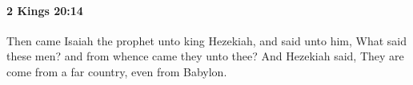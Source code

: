 
		\paragraph{2 Kings 20:14} %
			\label{2KINGS-20-14}

			Then came Isaiah the prophet unto king Hezekiah, and said unto him, What said these men? and from whence came they unto thee? And Hezekiah said, They are come from a far country, even from Babylon.


